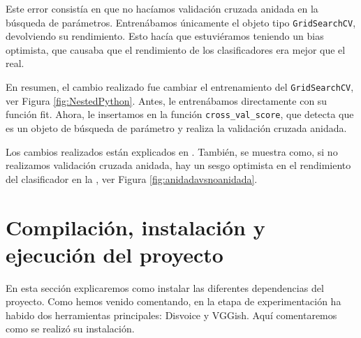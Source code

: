 \begin{tcolorbox}
Este error consistía en que no hacíamos validación cruzada anidada en la búsqueda de parámetros. Entrenábamos únicamente el objeto tipo \texttt{GridSearchCV}, devolviendo su rendimiento. Esto hacía que estuviéramos teniendo un bias optimista, que causaba que el rendimiento de los clasificadores era mejor que el real.
\end{tcolorbox}

En resumen, el cambio realizado fue cambiar el entrenamiento del \texttt{GridSearchCV}, ver Figura \ref{fig:NestedPython}. Antes, le entrenábamos directamente con su función fit. Ahora, le insertamos en la función \texttt{cross\_val\_score}, que detecta que es un objeto de búsqueda de parámetro y realiza la validación cruzada anidada.


Los cambios realizados están explicados en . También, se muestra como, si no realizamos validación cruzada anidada, hay un sesgo optimista en el rendimiento del clasificador en la , ver Figura \ref{fig:anidadavsnoanidada}.



\section{Compilación, instalación y ejecución del proyecto}\label{sec:instalacion}
En esta sección explicaremos como instalar las diferentes dependencias del proyecto. Como hemos venido comentando, en la etapa de experimentación ha habido dos herramientas principales: Disvoice y VGGish. Aquí comentaremos como se realizó su instalación.

